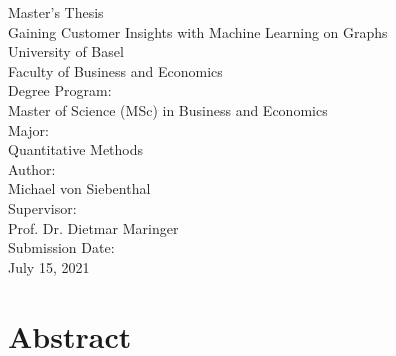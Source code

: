 \documentclass[12pt]{report}
\begin{document}
  
  \begin{titlepage}
    \begin{center}
      \vspace{1em}
	  \large{Master's Thesis}\\
	  \huge Gaining Customer Insights with Machine Learning on Graphs \\ 
	  \large \vspace{1em}
	  University of Basel\\
      Faculty of Business and Economics \\
	  \vspace{4em} 
	  \large
      Degree Program: \\
      Master of Science (MSc) in Business and Economics \\
      \vspace{2em}
      Major: \\
      Quantitative Methods \\
      \vspace{4em}
	  Author: \\
	  Michael von Siebenthal\\
	  \vspace{2em}
	  Supervisor: \\
	  Prof. Dr. Dietmar Maringer\\
	  \vspace{4em}
	  Submission Date: \\
      July 15, 2021
	  \vspace{3em}
    \end{center}
  \end{titlepage} 


  \chapter*{Abstract}
  
  \newpage

  \singlespacing
  \renewcommand{\contentsname}{Table of Contents}
  \setcounter{secnumdepth}{3}
  \setcounter{tocdepth}{3}
  \tableofcontents
  \newpage
  
  \listoffigures
  \newpage

  \listoftables
  \newpage

  \listofalgocfs 
  \newpage
\end{document}
